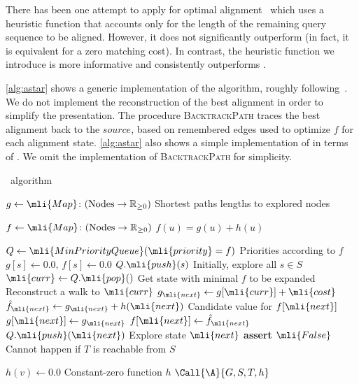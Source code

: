 There has been one attempt to apply \A for optimal
alignment~\cite{dox2018efficient} which uses a heuristic function that accounts
only for the length of the remaining query sequence to be aligned. However, it
does not significantly outperform \dijkstra (in fact, it is equivalent for
a zero matching cost).
%
In contrast, the heuristic function we introduce is more informative and
consistently outperforms \dijkstra.

\cref{alg:astar} shows a generic implementation of the \A algorithm,
roughly following~\cite{dechter_generalized_1985}.
We do not implement the reconstruction of the best alignment in order to simplify the presentation.
The procedure \mbox{\textsc{BacktrackPath}} traces the best alignment back to the $source$, based on remembered edges used to optimize $f$ for each alignment state.
%
\cref{alg:astar} also shows a simple implementation of \dijkstra in terms of \A.
We omit the implementation of \textsc{BacktrackPath} for simplicity.

\begin{algorithm}[t]
	\caption{\A~algorithm} \label{alg:astar}
	\begin{algorithmic}[1]
		\State $g \gets \mli{Map}\colon (\text{Nodes} \to \mathbb{R}_{\geq 0})$
		\Comment Shortest paths lengths to explored nodes

		\State $f \gets \mli{Map}\colon (\text{Nodes} \to \mathbb{R}_{\geq 0})$
		\Comment $f(u)=g(u)+h(u)$ 

		\State $Q \gets \mli{MinPriorityQueue}(\mli{priority}=f)$ 
		\Comment Priorities according to $f$
			\State $g[s] \gets 0.0,\, f[s] \gets 0.0$
			\State $Q.\mli{push}(s)$
			\Comment Initially, explore all $s \in S$
		\EndFor
			\State $\mli{curr} \gets Q.\mli{pop}()$
			\Comment Get state with minimal $f$ to be expanded
				\State \Return {}
				\Comment Reconstruct a walk to $\mli{curr}$
			\EndIf
			\State $g_\mli{next} \gets g[\mli{curr}] + \mli{cost}$
			\State $\hat{f}_\mli{next} \gets g_\mli{next} + h(\mli{next})$
				\Comment Candidate value for $f[\mli{next}]$
					\State $g[\mli{next}] \gets g_\mli{next}$		
					\State $f[\mli{next}] \gets \hat{f}_\mli{next}$		
					\State $Q.\mli{push}(\mli{next})$
					\Comment Explore state $\mli{next}$
				\EndIf
		\EndFor
		\EndWhile
		\State \textbf{assert} $\mli{False}$
		\Comment Cannot happen if $T$ is reachable from $S$
		\EndFunction

		\Statex

			\State $h(v) \gets 0.0$
			\Comment Constant-zero function $h$
			\State $\Call{\A}{G,S,T,h}$
		\EndFunction
	\end{algorithmic}
\end{algorithm}

